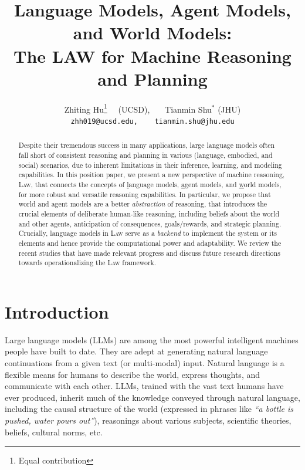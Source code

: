 \documentclass{article}
\title{Language Models, Agent Models, and World Models:\\
The LAW for Machine Reasoning and Planning}
\author{
Zhiting Hu\thanks{Equal contribution}~~ (UCSD),~~~ Tianmin Shu$^*$ (JHU) \\
\texttt{zhh019@ucsd.edu,~~~ tianmin.shu@jhu.edu}
}
\def\modelname{\textsc{Law}\xspace}
\newcommand{\hzt}[1]{{\color{red}{[ZT: #1]}}}
\begin{document}
\maketitle


\begin{abstract}
Despite their tremendous success in many applications, large language models often fall short of consistent reasoning and planning in various (language, embodied, and social) scenarios, due to inherent limitations in their inference, learning, and modeling capabilities. In this position paper, we present a new perspective of machine reasoning, \modelname, that connects the concepts of \uline{l}anguage models, \uline{a}gent models, and \uline{w}orld models, for more robust and versatile reasoning capabilities. In particular, we propose that world and agent models are a better {\it abstraction} of reasoning, that introduces the crucial elements of deliberate human-like reasoning, including beliefs about the world and other agents, anticipation of consequences, goals/rewards, and strategic planning. Crucially, language models in \modelname serve as a {\it backend} to implement the system or its elements and hence provide the computational power and adaptability. We review the recent studies that have made relevant progress and discuss future research directions towards operationalizing the \modelname framework.
\end{abstract}

\section{Introduction}\label{sec:intro}

Large language models (LLMs) are among the most powerful intelligent machines people have built to date. They are adept at generating natural language continuations from a given text (or multi-modal) input. Natural language is a flexible means for humans to describe the world, express thoughts, and communicate with each other. LLMs, trained with the vast text humans have ever produced, inherit much of the knowledge conveyed through natural language, including the causal structure of the world (expressed in phrases like {\it ``a bottle is pushed, water pours out''}), reasonings about various subjects, scientific theories, beliefs, cultural norms, etc. 
\end{document}
